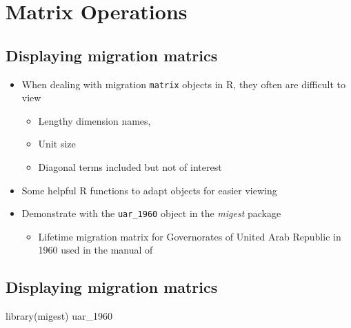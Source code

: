 \documentclass[
]{book}
\newenvironment{Shaded}{\begin{snugshade}}{\end{snugshade}}
\newcommand{\FunctionTok}[1]{\textcolor[rgb]{0.00,0.00,0.00}{#1}}
\newcommand{\NormalTok}[1]{#1}
\providecommand{\tightlist}{%
  \setlength{\itemsep}{0pt}\setlength{\parskip}{0pt}}
\begin{document}
\hypertarget{matrix-operations}{%
\section{Matrix Operations}\label{matrix-operations}}

\hypertarget{displaying-migration-matrics}{%
\subsection{Displaying migration matrics}\label{displaying-migration-matrics}}

\begin{itemize}
\tightlist
\item
  When dealing with migration \texttt{matrix} objects in R, they often are difficult to view

  \begin{itemize}
  \tightlist
  \item
    Lengthy dimension names,
  \item
    Unit size
  \item
    Diagonal terms included but not of interest
  \end{itemize}
\item
  Some helpful R functions to adapt objects for easier viewing
\item
  Demonstrate with the \texttt{uar\_1960} object in the \emph{migest} package

  \begin{itemize}
  \tightlist
  \item
    Lifetime migration matrix for Governorates of United Arab Republic in 1960 used in the manual of \citet{UnitedNations1983}
  \end{itemize}
\end{itemize}

\hypertarget{displaying-migration-matrics-1}{%
\subsection{Displaying migration matrics}\label{displaying-migration-matrics-1}}

\begin{Shaded}
\begin{Highlighting}[]
\FunctionTok{library}\NormalTok{(migest)}
\NormalTok{uar\_1960}
\end{Highlighting}
\end{Shaded}
\end{document}

